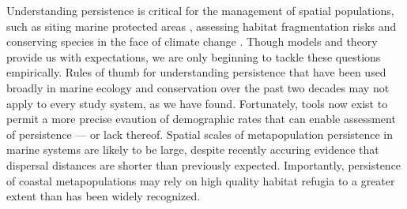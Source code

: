 \documentclass[12pt, oneside]{article}   	%
\begin{document}

Understanding persistence is critical for the management of spatial populations, such as siting marine protected areas \citep{kaplan_model-based_2009}, assessing habitat fragmentation risks \citep{smith2002population, fahrig2001much} and conserving species in the face of climate change \citep{coleman2017anticipating, fuller2015persistence}. Though models and theory provide us with expectations, we are only beginning to tackle these questions empirically. Rules of thumb for understanding persistence that have been used broadly in marine ecology and conservation over the past two decades may not apply to every study system, as we have found. Fortunately, tools now exist to permit a more precise evaution of demographic rates that can enable assessment of persistence --- or lack thereof. Spatial scales of metapopulation persistence in marine systems are likely to be large, despite recently accuring evidence that dispersal distances are shorter than previously expected. Importantly, persistence of coastal metapopulations may rely on high quality habitat refugia to a greater extent than has been widely recognized.
\end{document}
